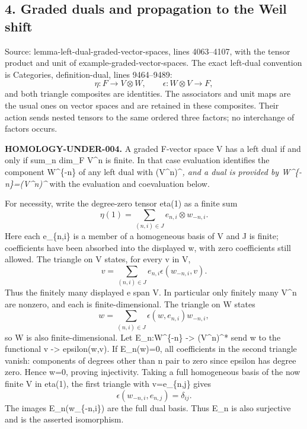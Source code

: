 \documentclass[11pt]{article}
\begin{document}
\subsection{4. Graded duals and propagation to the Weil shift}\label{note-03-graded-duals-and-propagation-to-the-weil-shift}

Source: lemma-left-dual-graded-vector-spaces, lines 4063--4107, with the tensor product and unit of example-graded-vector-spaces. The exact left-dual convention is Categories, definition-dual, lines 9464--9489: \[
\eta:F\longrightarrow V\otimes W,\qquad
\epsilon:W\otimes V\longrightarrow F,
\] and both triangle composites are identities. The associators and unit maps are the usual ones on vector spaces and are retained in these composites. Their action sends nested tensors to the same ordered three factors; no interchange of factors occurs.

\textbf{HOMOLOGY-UNDER-004.} A graded F-vector space V has a left dual if and only if sum\_n dim\_F V\^{}n is finite. In that case evaluation identifies the component W\^{}\{-n\} of any left dual with (V\^{}n)\^{}\emph{, and a dual is provided by W\^{}\{-n\}=(V\^{}n)\^{}} with the evaluation and coevaluation below.

For necessity, write the degree-zero tensor eta(1) as a finite sum \[
\eta(1)=\sum_{(n,i)\in J} e_{n,i}\otimes w_{-n,i}.
\] Here each e\_\{n,i\} is a member of a homogeneous basis of V and J is finite; coefficients have been absorbed into the displayed w, with zero coefficients still allowed. The triangle on V states, for every v in V, \[
v=\sum_{(n,i)\in J}e_{n,i}\epsilon(w_{-n,i},v).
\] Thus the finitely many displayed e span V. In particular only finitely many V\^{}n are nonzero, and each is finite-dimensional. The triangle on W states \[
w=\sum_{(n,i)\in J}\epsilon(w,e_{n,i})w_{-n,i},
\] so W is also finite-dimensional. Let E\_n:W\^{}\{-n\} -\textgreater{} (V\^{}n)\^{}* send w to the functional v -\textgreater{} epsilon(w,v). If E\_n(w)=0, all coefficients in the second triangle vanish: components of degrees other than n pair to zero since epsilon has degree zero. Hence w=0, proving injectivity. Taking a full homogeneous basis of the now finite V in eta(1), the first triangle with v=e\_\{n,j\} gives \[
\epsilon(w_{-n,i},e_{n,j})=\delta_{ij}.
\] The images E\_n(w\_\{-n,i\}) are the full dual basis. Thus E\_n is also surjective and is the asserted isomorphism.
\end{document}

